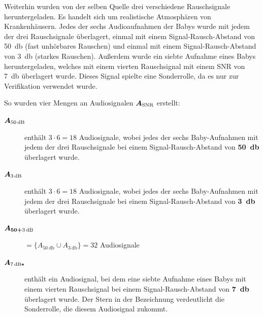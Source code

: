 Weiterhin wurden von der selben Quelle drei verschiedene Rauschsignale heruntergeladen. Es handelt sich um \glqq realistische\grqq{} Atmosphären von Krankenhäusern. Jedes der sechs Audioaufnahmen der Babys wurde mit jedem der drei Rauschsignale überlagert, einmal mit einem Signal-Rausch-Abstand von \SI{50}{\decibel} (\glqq fast unhörbares Rauschen\grqq) und einmal mit einem Signal-Rausch-Abstand von \SI{3}{\decibel} (\glqq starkes Rauschen\grqq). Außerdem wurde ein siebte Aufnahme eines Babys heruntergeladen, welches mit einem vierten Rauschsignal mit einem SNR von \SI{7}{\decibel} überlagert wurde. Dieses Signal spielte eine Sonderrolle, da es nur zur Verifikation verwendet wurde. 

So wurden vier Mengen an Audiosignalen $\boldmath{A_{\text{SNR}}}$ erstellt:

\begin{description}
	\item[$\boldmath{A_{\SI{50}{\decibel}}}$] enthält $3 \cdot 6 = 18$ Audiosignale, wobei jedes der sechs Baby-Aufnahmen mit jedem der drei Rauschsignale bei einem Signal-Rausch-Abstand von \textbf{\SI{50}{\decibel}} überlagert wurde.

	\item[$\boldmath{A_{\SI{3}{\decibel}}}$] enthält $3 \cdot 6 = 18$ Audiosignale, wobei jedes der sechs Baby-Aufnahmen mit jedem der drei Rauschsignale bei einem Signal-Rausch-Abstand von \textbf{\SI{3}{\decibel}} überlagert wurde.
	
	\item[$\boldmath{A_{50+\SI{3}{\decibel}}}$] $ = \{ A_{\SI{50}{\decibel}} \cup  A_{\SI{3}{\decibel}}\} = 32$ Audiosignale
	
	\item[$\boldmath{A_{\SI{7}{\decibel}*}}$] enthält ein Audiosignal, bei dem eine siebte Aufnahme eines Babys mit einem vierten Rauschsignal bei einem Signal-Rausch-Abstand von \textbf{\SI{7}{\decibel}} überlagert wurde. Der Stern in der Bezeichnung verdeutlicht die Sonderrolle, die diesem Audiosignal zukommt.
	
\end{description}

